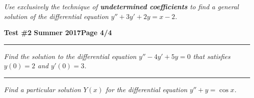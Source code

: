 \documentclass[12pt]{article}
\begin{document}
\bigskip
{\problem[30 pts] \em Use exclusively the technique of
\textbf{undetermined coefficients} to find a general solution of the
differential equation $y''+3y'+2y=x-2$.}
\vspace{20cm}
\begin{flushright}
\end{flushright}
\newpage

\hfill{\large\bf Test \#2}\hfill{\large\bf
  Summer 2017}\hfill{\large\bf Page 4/4}\hrule

\bigskip
{\problem[20 pts] \em Find the solution to the differential equation
$y''-4y'+5y=0$ that satisfies $y(0)=2$ and $y'(0)=3$.}
\vspace{6cm}
\begin{flushright}
\end{flushright}
\hrule
{\problem[20] \em Find a particular solution $Y(x)$ for the differential
equation $y''+y=\cos x$.}
\vspace{11.5cm}
\begin{flushright}
\end{flushright}
\end{document}
